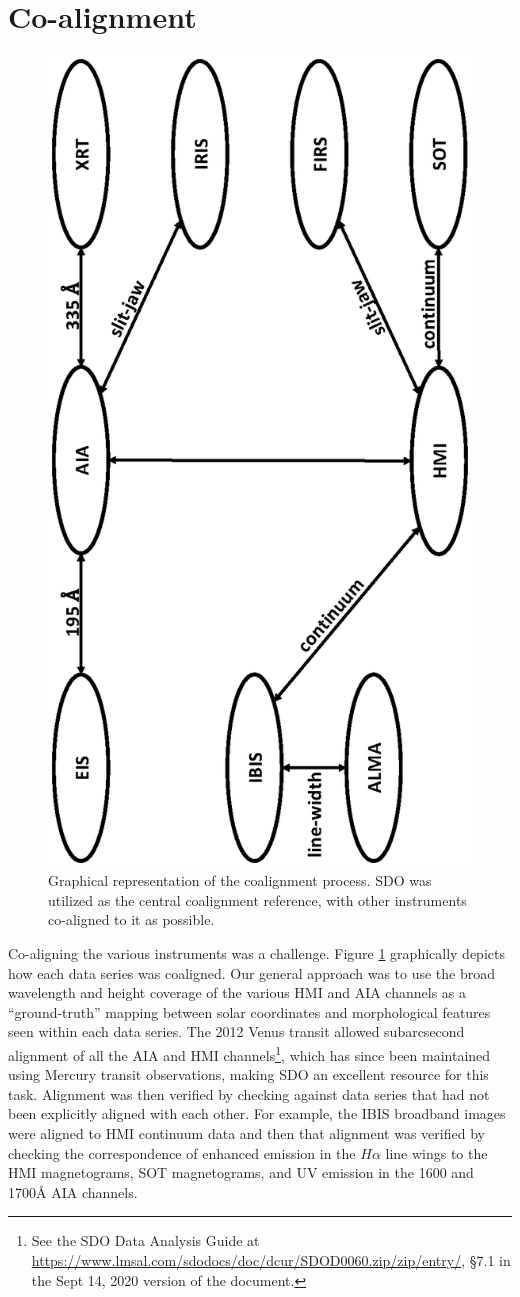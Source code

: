 \documentclass[twocolumn]{aastex62}
\newcommand{\figref}[1]{Figure \ref{#1}}
\newcommand{\halpha}{\ensuremath{H\alpha}}
\begin{document}
\section{Co-alignment} \label{sec:coalign}
\begin{figure}[b]
    \centering
    \includegraphics[trim=200 100 100 100, clip, width=0.5\linewidth, angle=270]{figures/co-alignment.eps}
    \caption{Graphical representation of the coalignment process. SDO was utilized as the central coalignment reference, with other instruments co-aligned to it as possible. }\label{fig:coalign}
\end{figure}

Co-aligning the various instruments was a challenge.  
\figref{fig:coalign} graphically depicts how each data series was coaligned.
Our general approach was to use the broad wavelength and height coverage of the various HMI and AIA channels as a ``ground-truth'' mapping between solar coordinates and morphological features seen within each data series.
The 2012 Venus transit allowed subarcsecond alignment of all the AIA and HMI channels\footnote{See the SDO Data Analysis Guide at \url{https://www.lmsal.com/sdodocs/doc/dcur/SDOD0060.zip/zip/entry/}, \S{}7.1 in the Sept 14, 2020 version of the document.}, which has since been maintained using Mercury transit observations, making SDO an excellent resource for this task.  
Alignment was then verified by checking against data series that had not been explicitly aligned with each other.
For example, the IBIS broadband images were aligned to HMI continuum data and then that alignment was verified by checking the correspondence of enhanced emission in the \halpha{} line wings to the HMI magnetograms, SOT magnetograms, and UV emission in the 1600 and 1700\AA{} AIA channels. 
\end{document}
